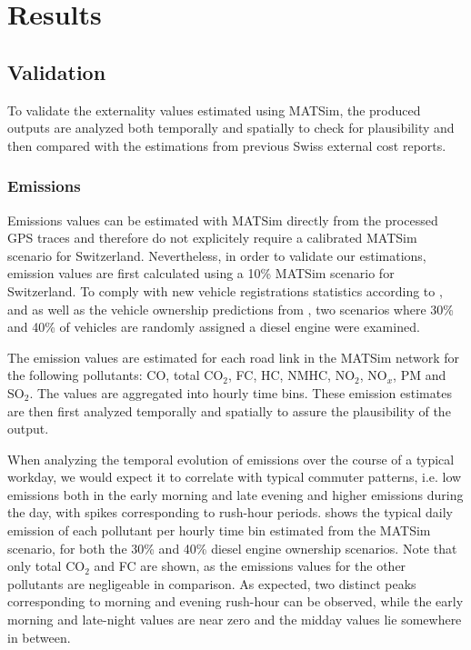 \section{Results}
\subsection{Validation}
To validate the externality values estimated using MATSim, the produced outputs are analyzed both temporally and spatially to check for plausibility and then compared with the estimations from previous Swiss external cost reports.

\subsubsection{Emissions}
Emissions values can be estimated with MATSim directly from the processed GPS traces and therefore do not explicitely require a calibrated MATSim scenario for Switzerland.
Nevertheless, in order to validate our estimations, emission values are first calculated using a 10\% MATSim scenario for Switzerland.
To comply with new vehicle registrations statistics according to \citet{autoschweiz2010}, \citet{autoschweiz2012} and \citet{energieVerbrauchEffizienzPersonenwagen2015} as well as the vehicle ownership predictions from \citet{foen2010pollutants}, two scenarios where 30\% and 40\% of vehicles are randomly assigned a diesel engine were examined.

The emission values are estimated for each road link in the MATSim network for the following pollutants: CO, total CO$_2$, FC, HC, NMHC, NO$_2$, NO$_x$, PM and SO$_2$.
The values are aggregated into hourly time bins.
These emission estimates are then first analyzed temporally and spatially to assure the plausibility of the output.

When analyzing the temporal evolution of emissions over the course of a typical workday, we would expect it to correlate with typical commuter patterns, i.e. low emissions both in the early morning and late evening and higher emissions during the day, with spikes corresponding to rush-hour periods.
 shows the typical daily emission of each pollutant per hourly time bin estimated from the MATSim scenario, for both the 30\% and 40\% diesel engine ownership scenarios.
Note that only total CO$_2$ and FC are shown, as the emissions values for the other pollutants are negligeable in comparison.
As expected, two distinct peaks corresponding to morning and evening rush-hour can be observed, while the early morning and late-night values are near zero and the midday values lie somewhere in between.

